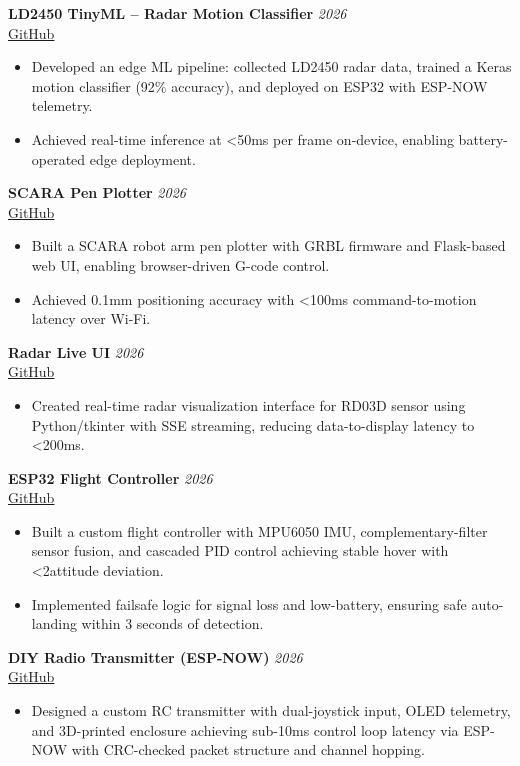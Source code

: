 \documentclass[10pt,a4paper]{article}
\newcommand{\role}[2]{\textbf{#1} \hfill \textit{#2}}
\begin{document}
\role{LD2450 TinyML -- Radar Motion Classifier}{2026} \\
\href{https://github.com/vass112/ld2450-tinyml}{GitHub}
\begin{itemize}
    \item Developed an edge ML pipeline: collected LD2450 radar data, trained a Keras motion classifier (92\% accuracy), and deployed on ESP32 with ESP-NOW telemetry.
    \item Achieved real-time inference at <50ms per frame on-device, enabling battery-operated edge deployment.
\end{itemize}

\role{SCARA Pen Plotter}{2026} \\
\href{https://github.com/vass112/scara-pen-plotter}{GitHub}
\begin{itemize}
    \item Built a SCARA robot arm pen plotter with GRBL firmware and Flask-based web UI, enabling browser-driven G-code control.
    \item Achieved 0.1mm positioning accuracy with <100ms command-to-motion latency over Wi-Fi.
\end{itemize}

\role{Radar Live UI}{2026} \\
\href{https://github.com/vass112/radar-live-ui}{GitHub}
\begin{itemize}
    \item Created real-time radar visualization interface for RD03D sensor using Python/tkinter with SSE streaming, reducing data-to-display latency to <200ms.
\end{itemize}

\role{ESP32 Flight Controller}{2026} \\
\href{https://github.com/vass112}{GitHub}
\begin{itemize}
    \item Built a custom flight controller with MPU6050 IMU, complementary-filter sensor fusion, and cascaded PID control achieving stable hover with <2\textdegree attitude deviation.
    \item Implemented failsafe logic for signal loss and low-battery, ensuring safe auto-landing within 3 seconds of detection.
\end{itemize}

\role{DIY Radio Transmitter (ESP-NOW)}{2026} \\
\href{https://github.com/vass112}{GitHub}
\begin{itemize}
    \item Designed a custom RC transmitter with dual-joystick input, OLED telemetry, and 3D-printed enclosure achieving sub-10ms control loop latency via ESP-NOW with CRC-checked packet structure and channel hopping.
\end{itemize}
\end{document}
